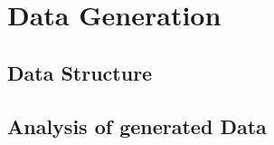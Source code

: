 \section{Data Generation}
\label{sec:DataGeneration}

\subsection{Data Structure}
\label{sec:DataStructure}

\subsection{Analysis of generated Data}
\label{sec:AnalysisOfGeneratedData}
